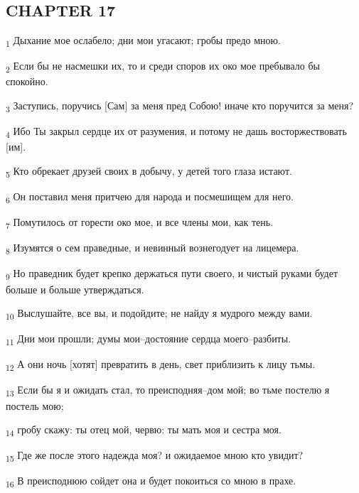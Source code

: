\subsection{CHAPTER 17}
\begin{tcolorbox}
\textsubscript{1} Дыхание мое ослабело; дни мои угасают; гробы предо мною.
\end{tcolorbox}
\begin{tcolorbox}
\textsubscript{2} Если бы не насмешки их, то и среди споров их око мое пребывало бы спокойно.
\end{tcolorbox}
\begin{tcolorbox}
\textsubscript{3} Заступись, поручись [Сам] за меня пред Собою! иначе кто поручится за меня?
\end{tcolorbox}
\begin{tcolorbox}
\textsubscript{4} Ибо Ты закрыл сердце их от разумения, и потому не дашь восторжествовать [им].
\end{tcolorbox}
\begin{tcolorbox}
\textsubscript{5} Кто обрекает друзей своих в добычу, у детей того глаза истают.
\end{tcolorbox}
\begin{tcolorbox}
\textsubscript{6} Он поставил меня притчею для народа и посмешищем для него.
\end{tcolorbox}
\begin{tcolorbox}
\textsubscript{7} Помутилось от горести око мое, и все члены мои, как тень.
\end{tcolorbox}
\begin{tcolorbox}
\textsubscript{8} Изумятся о сем праведные, и невинный вознегодует на лицемера.
\end{tcolorbox}
\begin{tcolorbox}
\textsubscript{9} Но праведник будет крепко держаться пути своего, и чистый руками будет больше и больше утверждаться.
\end{tcolorbox}
\begin{tcolorbox}
\textsubscript{10} Выслушайте, все вы, и подойдите; не найду я мудрого между вами.
\end{tcolorbox}
\begin{tcolorbox}
\textsubscript{11} Дни мои прошли; думы мои--достояние сердца моего--разбиты.
\end{tcolorbox}
\begin{tcolorbox}
\textsubscript{12} А они ночь [хотят] превратить в день, свет приблизить к лицу тьмы.
\end{tcolorbox}
\begin{tcolorbox}
\textsubscript{13} Если бы я и ожидать стал, то преисподняя--дом мой; во тьме постелю я постель мою;
\end{tcolorbox}
\begin{tcolorbox}
\textsubscript{14} гробу скажу: ты отец мой, червю: ты мать моя и сестра моя.
\end{tcolorbox}
\begin{tcolorbox}
\textsubscript{15} Где же после этого надежда моя? и ожидаемое мною кто увидит?
\end{tcolorbox}
\begin{tcolorbox}
\textsubscript{16} В преисподнюю сойдет она и будет покоиться со мною в прахе.
\end{tcolorbox}
